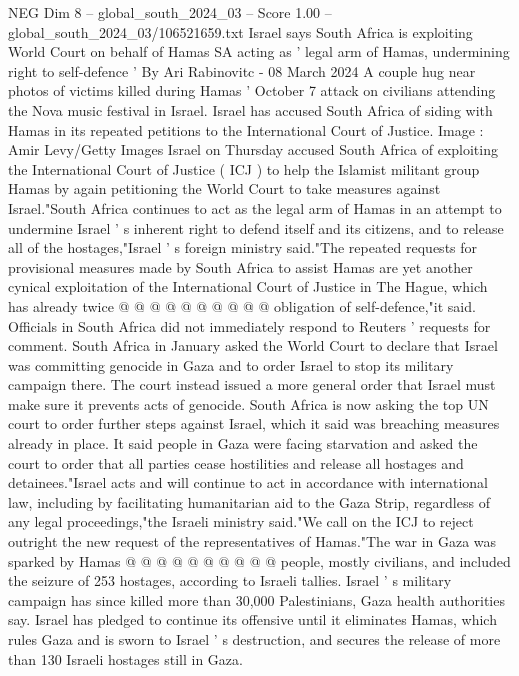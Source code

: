\begin{textsample}{NEG Dim 8 – global\_south\_2024\_03 – Score 1.00 – global\_south\_2024\_03/106521659.txt}  \label{ex:f8_neg_368}
Israel says South Africa is exploiting World Court on behalf of Hamas SA acting as ' legal arm of Hamas, undermining right to self-defence ' By Ari Rabinovitc - 08 March 2024 A couple hug near photos of victims killed during Hamas ' October 7 attack on civilians attending the Nova music festival in Israel.
Israel has accused South Africa of siding with Hamas in its repeated petitions to the International Court of Justice.
Image : Amir Levy/Getty Images Israel on Thursday accused South Africa of exploiting the International Court of Justice ( ICJ ) to help the Islamist militant group Hamas by again petitioning the World Court to take measures against Israel."South Africa continues to act as the legal arm of Hamas in an attempt to undermine Israel ' s inherent right to defend itself and its citizens, and to release all of the hostages,"Israel ' s foreign ministry said."The repeated requests for provisional measures made by South Africa to assist Hamas are yet another cynical exploitation of the International Court of Justice in The Hague, which has already twice @ @ @ @ @ @ @ @ @ @ obligation of self-defence,"it said.
Officials in South Africa did not immediately respond to Reuters ' requests for comment.
South Africa in January asked the World Court to declare that Israel was committing genocide in Gaza and to order Israel to stop its military campaign there.
The court instead issued a more general order that Israel must make sure it prevents acts of genocide.
South Africa is now asking the top UN court to order further steps against Israel, which it said was breaching measures already in place.
It said people in Gaza were facing starvation and asked the court to order that all parties cease hostilities and release all hostages and detainees."Israel acts and will continue to act in accordance with international law, including by facilitating humanitarian aid to the Gaza Strip, regardless of any legal proceedings,"the Israeli ministry said."We call on the ICJ to reject outright the new request of the representatives of Hamas."The war in Gaza was sparked by Hamas @ @ @ @ @ @ @ @ @ @ people, mostly civilians, and included the seizure of 253 hostages, according to Israeli tallies.
Israel ' s military campaign has since killed more than 30,000 Palestinians, Gaza health authorities say.
Israel has pledged to continue its offensive until it eliminates Hamas, which rules Gaza and is sworn to Israel ' s destruction, and secures the release of more than 130 Israeli hostages still in Gaza.

\end{textsample}
